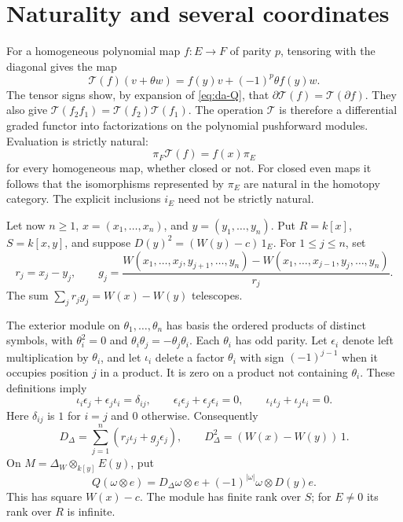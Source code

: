 \section{Naturality and several coordinates}
\label{sec:da-several}

For a homogeneous polynomial map \(f:E\to F\) of parity \(p\),
tensoring with the diagonal gives the map
\[
 \mathcal T(f)(v+\theta w)
   =f(y)v+(-1)^p\theta f(y)w.
\]
The tensor signs show, by expansion of
\eqref{eq:da-Q}, that
\(\partial\mathcal T(f)=\mathcal T(\partial f)\).
They also give
\(\mathcal T(f_2f_1)=\mathcal T(f_2)\mathcal T(f_1)\).
The operation \(\mathcal T\) is therefore a differential graded
functor into factorizations on the polynomial pushforward modules.
Evaluation is strictly natural:
\begin{equation}
 \pi_F\mathcal T(f)=f(x)\pi_E
 \label{eq:da-natural}
\end{equation}
for every homogeneous map, whether closed or not.
For closed even maps it follows that the isomorphisms represented
by \(\pi_E\) are natural in the homotopy category.
The explicit inclusions \(i_E\) need not be strictly natural.

Let now \(n\geq1\), \(x=(x_1,\ldots,x_n)\), and
\(y=(y_1,\ldots,y_n)\).
Put \(R=k[x]\), \(S=k[x,y]\), and suppose
\(D(y)^2=(W(y)-c)\,1_E\).
For \(1\leq j\leq n\), set
\[
 r_j=x_j-y_j,\qquad
 g_j=
 \frac{
 W(x_1,\ldots,x_j,y_{j+1},\ldots,y_n)
 -W(x_1,\ldots,x_{j-1},y_j,\ldots,y_n)}
 {r_j}.
\]
The sum \(\sum_jr_jg_j=W(x)-W(y)\) telescopes.

The exterior module on \(\theta_1,\ldots,\theta_n\) has basis
the ordered products of distinct symbols, with
\(\theta_i^2=0\) and \(\theta_i\theta_j=-\theta_j\theta_i\).
Each \(\theta_i\) has odd parity. Let \(\epsilon_i\) denote left
multiplication by \(\theta_i\), and let \(\iota_i\) delete a
factor \(\theta_i\) with sign \((-1)^{j-1}\) when it occupies
position \(j\) in a product. It is zero on a product not containing
\(\theta_i\). These definitions imply
\[
 \iota_i\epsilon_j+\epsilon_j\iota_i=\delta_{ij},\qquad
 \epsilon_i\epsilon_j+\epsilon_j\epsilon_i=0,\qquad
 \iota_i\iota_j+\iota_j\iota_i=0.
\]
Here \(\delta_{ij}\) is \(1\) for \(i=j\) and \(0\) otherwise.
Consequently
\[
 D_\Delta=\sum_{j=1}^n(r_j\iota_j+g_j\epsilon_j),
 \qquad D_\Delta^2=(W(x)-W(y))\,1.
\]
On \(M=\Delta_W\otimes_{k[y]}E(y)\), put
\[
 Q(\omega\otimes e)
   =D_\Delta\omega\otimes e+(-1)^{|\omega|}\omega\otimes D(y)e.
\]
This has square \(W(x)-c\).
The module has finite rank over \(S\); for \(E\ne0\) its rank
over \(R\) is infinite.

